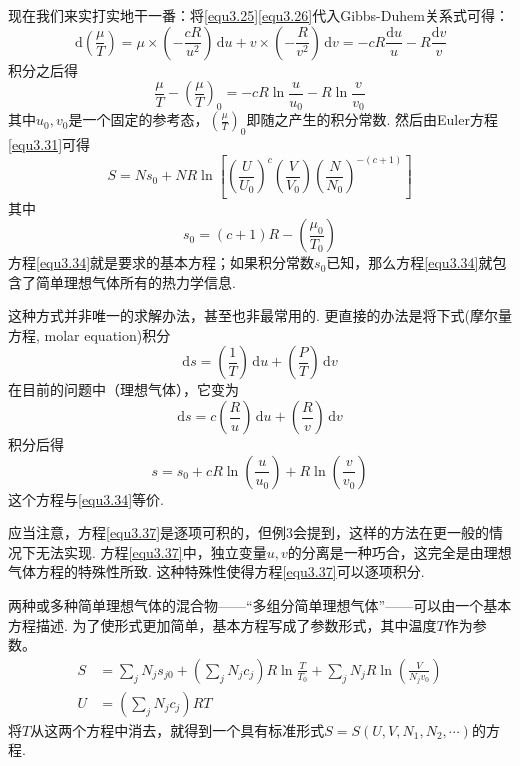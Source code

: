 现在我们来实打实地干一番：将\eqref{equ3.25}\eqref{equ3.26}代入Gibbs-Duhem关系式可得：
\begin{equation}
\label{equ3.32}
\,\text{d}\left(\frac{\mu}{T}\right)=\mu\times\left(-\frac{cR}{u^2}\right)\,\text{d}u+v\times\left(-\frac{R}{v^2}\right)\,\text{d}v=-cR\frac{\text{d}u}{u}-R\frac{\text{d}v}{v}
\end{equation}
积分之后得
\begin{equation}
\label{equ3.33}
\frac{\mu}{T}- \left( \frac{\mu}{T} \right)_0 = -cR\ln{\frac{u}{u_0}}-R\ln{\frac{v}{v_0}}
\end{equation}
其中$u_0,v_0$是一个固定的参考态，$\displaystyle{ \left( \frac{\mu}{T} \right)_0 }$即随之产生的积分常数. 然后由Euler方程\eqref{equ3.31}可得
\begin{equation}
\label{equ3.34}
S=Ns_0+NR\ln\left[\left(\frac{U}{U_0}\right)^c\left(\frac{V}{V_0}\right)\left(\frac{N}{N_0}\right)^{-(c+1)}\right]
\end{equation}
其中
\begin{equation}
\label{equ3.35}
s_0=(c+1)R-\left(\frac{\mu_0}{T_0}\right)
\end{equation}
方程\eqref{equ3.34}就是要求的基本方程；如果积分常数$s_0$已知，那么方程\eqref{equ3.34}就包含了简单理想气体所有的热力学信息.

这种方式并非唯一的求解办法，甚至也非最常用的. 更直接的办法是将下式(摩尔量方程, molar equation)积分
\begin{equation}
\label{equ3.36}
\text{d}s=\left(\frac{1}{T}\right)\,\text{d}u+\left(\frac{P}{T}\right)\,\text{d}v
\end{equation}
在目前的问题中（理想气体），它变为
\begin{equation}
\label{equ3.37}
\text{d}s=c\left(\frac{R}{u}\right)\,\text{d}u+\left(\frac{R}{v}\right)\,\text{d}v
\end{equation}
积分后得
\begin{equation}
\label{equ3.38}
s = s_0 + cR \ln \left( \frac{u}{u_0} \right) + R\ln \left( \frac{v}{v_0} \right)
\end{equation}
这个方程与\eqref{equ3.34}等价.

应当注意，方程\eqref{equ3.37}是逐项可积的，但例3会提到，这样的方法在更一般的情况下无法实现. 方程\eqref{equ3.37}中，独立变量$u,v$的分离是一种巧合，这完全是由理想气体方程的特殊性所致. 这种特殊性使得方程\eqref{equ3.37}可以逐项积分.

两种或多种简单理想气体的混合物——“多组分简单理想气体”——可以由一个基本方程描述. 为了使形式更加简单，基本方程写成了参数形式，其中温度$T$作为参数。
\begin{equation}
\label{equ3.39}
\begin{split}
    S &= \sum_j N_j s_{j0} + \left(\sum_j N_jc_j\right) R \ln \frac{T}{T_0} + \sum_j N_jR\ln\left(\frac{V}{N_jv_0}\right) \\
    U &= \left(\sum_jN_jc_j\right)RT
\end{split}
\end{equation}
将$T$从这两个方程中消去，就得到一个具有标准形式$S=S(U,V,N_1,N_2,\cdots)$的方程.

